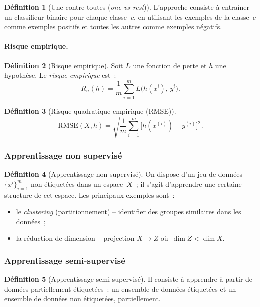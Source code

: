 \documentclass[a4paper,12pt,twoside]{report}
\theoremstyle{definition}
\newtheorem{defi}{Définition}
\theoremstyle{plain}
\theoremstyle{remark}
\begin{document}
\begin{defi}[Une-contre-toutes (\textit{one-vs-rest})]
L'approche consiste à entraîner un classifieur binaire pour chaque classe~$c$, en utilisant
les exemples de la classe~$c$ comme exemples positifs et toutes les autres comme exemples
négatifs.
\end{defi}

\paragraph{Risque empirique.}

\begin{defi}[Risque empirique]
Soit $L$ une fonction de perte et $h$ une hypothèse. Le \emph{risque empirique} est~:
\[
R_n(h) = \frac{1}{m} \sum_{i=1}^{m} L\!\bigl(h(x^i),\, y^i\bigr).
\]
\end{defi}

\begin{defi}[Risque quadratique empirique (\acs{RMSE})]
\[
\text{RMSE}(X, h) = \sqrt{\frac{1}{m} \sum_{i=1}^{m}
\bigl[h(x^{(i)}) - y^{(i)}\bigr]^2}.
\]
\end{defi}

\subsubsection*{Apprentissage non supervisé}

\begin{defi}[Apprentissage non supervisé]
On dispose d'un jeu de données $\{x^i\}_{i=1}^{m}$ non étiquetées dans un espace~$X$~;
il s'agit d'apprendre une certaine structure de cet espace. Les principaux exemples sont~:
\begin{itemize}
	\item le \textit{clustering} (partitionnement) -- identifier des groupes similaires
	      dans les données~;
	\item la réduction de dimension -- projection $X \to Z$ où~$\dim Z < \dim X$.
\end{itemize}
\end{defi}

\subsubsection*{Apprentissage semi-supervisé}

\begin{defi}[Apprentissage semi-supervisé]
Il consiste à apprendre à partir de données partiellement étiquetées~: un ensemble de
données étiquetées et un ensemble de données non étiquetées, partiellement.
\end{defi}
\end{document}
